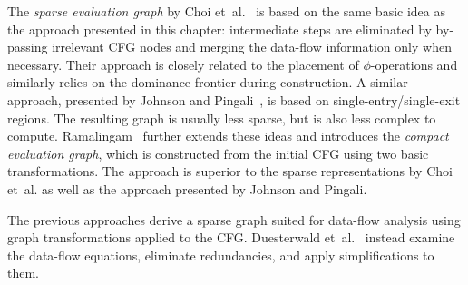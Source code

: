 The \emph{sparse evaluation graph} by Choi et~al.~\cite{novillo:bib:CCF91} is
based on the same basic idea as the approach presented in this chapter:
intermediate steps are eliminated by by-passing irrelevant CFG nodes and
merging the data-flow information only when necessary. Their approach is closely
related to the placement of $\phi$-operations and similarly relies on the
dominance frontier during construction. A similar approach, presented by Johnson
and Pingali~\cite{novillo:bib:JO93}, is based on single-entry/single-exit
regions. The resulting graph is usually less sparse, but is also less complex to
compute. Ramalingam~\cite{Ramalingam02} further extends these ideas and
introduces the \emph{compact evaluation graph}, which is constructed from the
initial CFG using two basic transformations. The approach is superior to the
sparse representations by Choi et~al. as well as the approach presented by
Johnson and Pingali.

The previous approaches derive a sparse graph suited for data-flow analysis
using graph transformations applied to the CFG.
Duesterwald et~al.~\cite{novillo:bib:DGS94} instead examine the data-flow
equations, eliminate redundancies, and apply simplifications to them.

